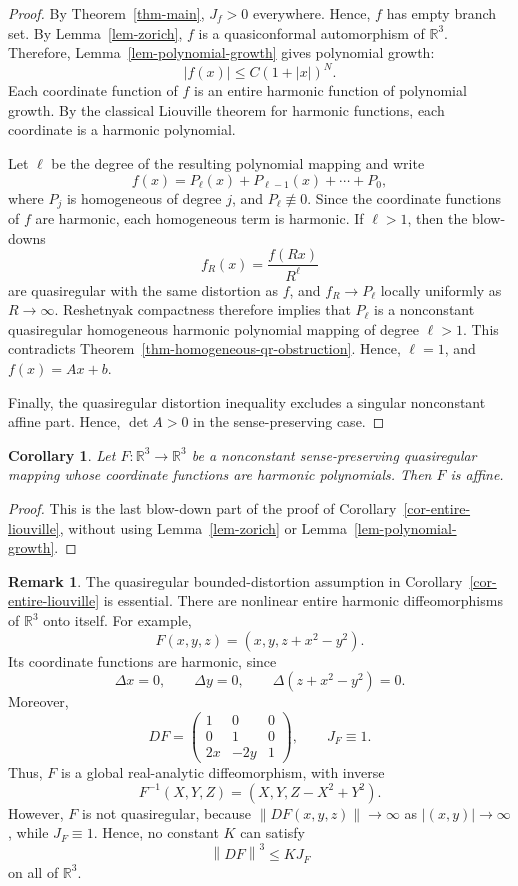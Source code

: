 \documentclass[10pt]{amsart}
\numberwithin{equation}{section}
\newtheorem{corollary}[theorem]{Corollary}
\theoremstyle{definition}
\newtheorem{remark}{Remark}[section]
\newcommand{\R}{\mathbb R}
\newcommand{\norm}[1]{\left\|#1\right\|}
\begin{document}
\begin{proof}
By Theorem~\ref{thm-main}, \(J_f>0\) everywhere. Hence, \(f\) has empty
branch set. By Lemma~\ref{lem-zorich}, \(f\) is a quasiconformal
automorphism of \(\R^3\). Therefore, Lemma~\ref{lem-polynomial-growth} gives
polynomial growth:
\[
        |f(x)|\le C(1+|x|)^N.
\]
Each coordinate function of \(f\) is an entire harmonic function of
polynomial growth. By the classical Liouville theorem for harmonic
functions, each coordinate is a harmonic polynomial.

Let \(\ell\) be the degree of the resulting polynomial mapping and write
\[
        f(x)=P_\ell(x)+P_{\ell-1}(x)+\cdots+P_0,
\]
where \(P_j\) is homogeneous of degree \(j\), and \(P_\ell\not\equiv0\). Since
the coordinate functions of \(f\) are harmonic, each homogeneous term is
harmonic. If \(\ell>1\), then the blow-downs
\[
        f_R(x)=\frac{f(Rx)}{R^\ell}
\]
are quasiregular with the same distortion as \(f\), and \(f_R\to P_\ell\)
locally uniformly as \(R\to\infty\). Reshetnyak compactness therefore
implies that \(P_\ell\) is a nonconstant quasiregular homogeneous harmonic
polynomial mapping of degree \(\ell>1\). This contradicts
Theorem~\ref{thm-homogeneous-qr-obstruction}. Hence, \(\ell=1\), and
\(f(x)=Ax+b\).

Finally, the quasiregular distortion inequality excludes a singular
nonconstant affine part. Hence, \(\det A>0\) in the sense-preserving case.
\end{proof}

\begin{corollary}
Let \(F:\R^3\to\R^3\) be a nonconstant sense-preserving quasiregular mapping
whose coordinate functions are harmonic polynomials. Then \(F\) is affine.
\end{corollary}

\begin{proof}
This is the last blow-down part of the proof of
Corollary~\ref{cor-entire-liouville}, without using Lemma~\ref{lem-zorich}
or Lemma~\ref{lem-polynomial-growth}.
\end{proof}

\begin{remark}
The quasiregular bounded-distortion assumption in
Corollary~\ref{cor-entire-liouville} is essential. There are nonlinear entire
harmonic diffeomorphisms of \(\R^3\) onto itself. For example,
\[
        F(x,y,z)=(x,y,z+x^2-y^2).
\]
Its coordinate functions are harmonic, since
\[
        \Delta x=0,
        \qquad
        \Delta y=0,
        \qquad
        \Delta(z+x^2-y^2)=0.
\]
Moreover,
\[
        DF=
        \begin{pmatrix}
        1 & 0 & 0\\
        0 & 1 & 0\\
        2x & -2y & 1
        \end{pmatrix},
        \qquad
        J_F\equiv1.
\]
Thus, \(F\) is a global real-analytic diffeomorphism, with inverse
\[
        F^{-1}(X,Y,Z)=(X,Y,Z-X^2+Y^2).
\]
However, \(F\) is not quasiregular, because
\(\norm{DF(x,y,z)}\to\infty\) as \(|(x,y)|\to\infty\), while \(J_F\equiv1\).
Hence, no constant \(K\) can satisfy
\[
        \norm{DF}^3\le KJ_F
\]
on all of \(\R^3\).
\end{remark}
\end{document}

